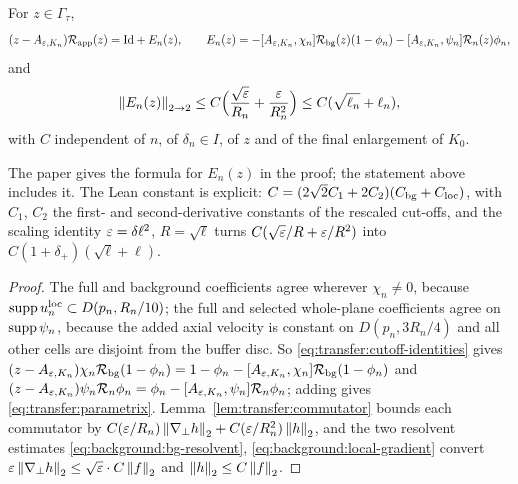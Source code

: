 \begin{lemma}
  \label{lem:parametrix-error}
  \leanok
  For $z\in\Gamma_\tau$,
  \begin{equation}
    (z-A_{\varepsilon,K_n})\mathcal{R}_{\rm app}(z)=\mathrm{Id}+E_n(z),
    \qquad
    E_n(z)=-[A_{\varepsilon,K_n},\chi_n]\mathcal{R}_{\rm bg}(z)(1-\phi_n)
      -[A_{\varepsilon,K_n},\psi_n]\mathcal{R}_n(z)\phi_n,
    \label{eq:transfer:parametrix}
  \end{equation}
  and
  \begin{equation}
    \left\|E_n(z)\right\|_{2\to2}\leq C\Bigl(\frac{\sqrt{\varepsilon}}{R_n}+\frac{\varepsilon}{R_n^2}\Bigr)
      \leq C(\sqrt{\ell_n}+\ell_n),
    \label{eq:transfer:explicit-error}
  \end{equation}
  with $C$ independent of $n$, of $\delta_n\in I$, of $z$ and of the final enlargement of
  $K_0$.
\end{lemma}

The paper gives the formula for $E_n(z)$ in the proof; the statement above includes it.
The Lean constant is explicit: $C=(2\sqrt2C_1+2C_2)(C_{\rm bg}+C_{\rm loc})$, with $C_1$,
$C_2$ the first- and second-derivative constants of the rescaled cut-offs, and the scaling
identity $\varepsilon=\delta\ell^2$, $R=\sqrt\ell$ turns $C(\sqrt{\varepsilon}/R+\varepsilon/R^2)$ into
$C(1+\delta_+)(\sqrt\ell+\ell)$.

\begin{proof}
  \leanok
  The full and background coefficients agree wherever $\chi_n\neq0$, because
  $\operatorname{supp} u_n^{\rm loc}\subset D(p_n,R_n/10)$; the full and selected whole-plane
  coefficients agree on $\operatorname{supp}\psi_n$, because the added axial velocity is constant on
  $D(p_n,3R_n/4)$ and all other cells are disjoint from the buffer disc.  So
  \eqref{eq:transfer:cutoff-identities} gives
  $(z-A_{\varepsilon,K_n})\chi_n\mathcal{R}_{\rm bg}(1-\phi_n)
  =1-\phi_n-[A_{\varepsilon,K_n},\chi_n]\mathcal{R}_{\rm bg}(1-\phi_n)$ and
  $(z-A_{\varepsilon,K_n})\psi_n\mathcal{R}_n\phi_n=\phi_n-[A_{\varepsilon,K_n},\psi_n]\mathcal{R}_n\phi_n$; adding gives
  \eqref{eq:transfer:parametrix}.  Lemma~\ref{lem:transfer:commutator} bounds each
  commutator by $C(\varepsilon/R_n)\left\|\nabla_\perp h\right\|_2+C(\varepsilon/R_n^2)\left\|h\right\|_2$, and the two
  resolvent estimates \eqref{eq:background:bg-resolvent},
  \eqref{eq:background:local-gradient} convert
  $\varepsilon\left\|\nabla_\perp h\right\|_2\leq\sqrt{\varepsilon}\cdot C\left\|f\right\|_2$ and
  $\left\|h\right\|_2\leq C\left\|f\right\|_2$.
\end{proof}

